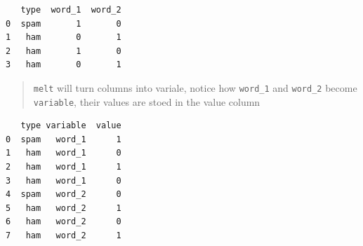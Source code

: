 \documentclass[11pt]{article}
\begin{document}
    
    
    \begin{verbatim}
   type  word_1  word_2
0  spam       1       0
1   ham       0       1
2   ham       1       0
3   ham       0       1
    \end{verbatim}

    
    \begin{quote}
\texttt{melt} will turn columns into variale, notice how
\texttt{word\_1} and \texttt{word\_2} become \texttt{variable}, their
values are stoed in the value column
\end{quote}

    
    
    \begin{verbatim}
   type variable  value
0  spam   word_1      1
1   ham   word_1      0
2   ham   word_1      1
3   ham   word_1      0
4  spam   word_2      0
5   ham   word_2      1
6   ham   word_2      0
7   ham   word_2      1
    \end{verbatim}
\end{document}
